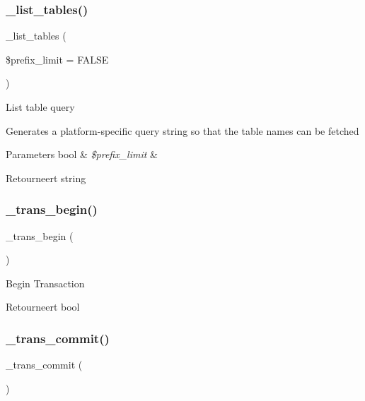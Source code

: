 \subsubsection{\texorpdfstring{\_list\_tables()}{\_list\_tables()}}
{\footnotesize\ttfamily \+\_\+list\+\_\+tables (\begin{DoxyParamCaption}\item[{}]{\$prefix\+\_\+limit = {\ttfamily FALSE} }\end{DoxyParamCaption})\hspace{0.3cm}{\ttfamily [protected]}}

List table query

Generates a platform-\/specific query string so that the table names can be fetched


\begin{DoxyParams}[1]{Parameters}
bool & {\em \$prefix\+\_\+limit} & \\
\hline
\end{DoxyParams}
\begin{DoxyReturn}{Retourneert}
string 
\end{DoxyReturn}
\mbox{\label{class_c_i___d_b__ibase__driver_ac81ac882c1d54347d810199a15856aac}} 
\subsubsection{\texorpdfstring{\_trans\_begin()}{\_trans\_begin()}}
{\footnotesize\ttfamily \+\_\+trans\+\_\+begin (\begin{DoxyParamCaption}{ }\end{DoxyParamCaption})\hspace{0.3cm}{\ttfamily [protected]}}

Begin Transaction

\begin{DoxyReturn}{Retourneert}
bool 
\end{DoxyReturn}
\mbox{\label{class_c_i___d_b__ibase__driver_a6fe7f373e0b11cfae23a5f41c0b35dda}} 
\subsubsection{\texorpdfstring{\_trans\_commit()}{\_trans\_commit()}}
{\footnotesize\ttfamily \+\_\+trans\+\_\+commit (\begin{DoxyParamCaption}{ }\end{DoxyParamCaption})\hspace{0.3cm}{\ttfamily [protected]}}

